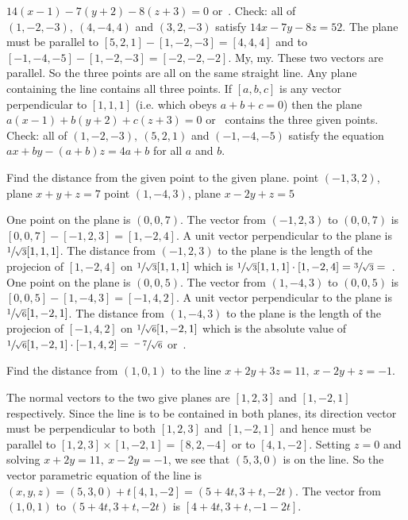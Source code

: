 {$14(x-1)-7(y+2)-8(z+3)=0$ or $\,$. Check: all of 
$(1,-2,-3),\ (4,-4,4)$ and $(3,2,-3)$ satisfy $14x-7y-8z=52$.
 The plane must be parallel to $[5,2,1]-[1,-2,-3]=[4,4,4]$
 and to $[-1,-4,-5]-[1,-2,-3]=[-2,-2,-2]$. My, my. These two vectors are
parallel. So the three points are all on the same straight line. Any
plane containing the line contains all three points. If $[a,b,c]$
is any vector perpendicular to $[1,1,1]$ (i.e. which obeys $a+b+c=0$)
then the plane  
$a(x-1)+b(y+2)+c(z+3)=0$ or $\,$ contains the
three given points. Check: all of 
$(1,-2,-3),\ (5,2,1)$ and $(-1,-4,-5)$ satisfy the equation $ax+by-(a+b)z=4a+b$ 
for all $a$ and $b$.
\medskip
\item{\next} Find the distance from the given point to the given plane.
 point $(-1,3,2)$, plane $x+y+z=7$
 point $(1,-4,3)$, plane $x-2y+z=5$
\smallskip
\item{}\soln 
{} One point on the plane is $(0,0,7)$. The vector from $(-1,2,3)$
to $(0,0,7)$ is $[0,0,7]-[-1,2,3]=[1,-2,4]$. A unit vector perpendicular
to the plane is $\sfrac{1}{\sqrt{3}}[1,1,1]$. The distance from  
$(-1,2,3)$ to the plane is the length of the projecion of $[1,-2,4]$
on $\sfrac{1}{\sqrt{3}}[1,1,1]$ which is $\sfrac{1}{\sqrt{3}}[1,1,1]\cdot
[1,-2,4]=\sfrac{3}{\sqrt{3}}=$ $\,$.
 One point on the plane is $(0,0,5)$. The vector from $(1,-4,3)$
to $(0,0,5)$ is $[0,0,5]-[1,-4,3]=[-1,4,2]$. A unit vector perpendicular
to the plane is $\sfrac{1}{\sqrt{6}}[1,-2,1]$. The distance from  
$(1,-4,3)$ to the plane is the length of the projecion of $[-1,4,2]$
on $\sfrac{1}{\sqrt{6}}[1,-2,1]$ which is the absolute value of $\sfrac{1}{\sqrt{6}}[1,-2,1]\cdot
[-1,4,2]=\sfrac{-7}{\sqrt{6}}$ or $\,$.
\medskip
\item{\next} Find the distance from $(1,0,1)$ to the line
$x+2y+3z=11,\ x-2y+z=-1$. 
\item{}\soln The normal vectors to the two give planes are 
$[1,2,3]$ and $[1,-2,1]$ respectively. Since the line is to be contained
in both planes, its direction vector must be perpendicular to both 
$[1,2,3]$ and $[1,-2,1]$ and hence must be parallel to 
$[1,2,3]\times[1,-2,1]=[8, 2,-4]$ or to $[4,1,-2]$. Setting $z=0$ and
solving $x+2y=11,\ x-2y=-1$, we see that $(5,3,0)$ is on the line. So
the vector parametric equation of the line is $(x,y,z)=(5,3,0)+t[4,1,-2]
=(5+4t,3+t,-2t)$.
The vector from $(1,0,1)$ to $(5+4t,3+t,-2t)$ is $[4+4t,3+t,-1-2t]$.
}
